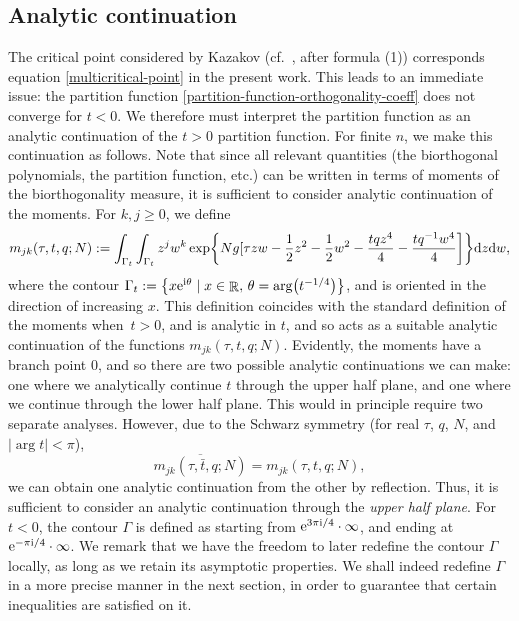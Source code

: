 \documentclass[pdftex]{sigma}
\DeclareMathOperator{\RR}{\mathbb{R}}
\numberwithin{equation}{section}
\begin{document}
\subsection{Analytic continuation}
The critical point considered by Kazakov (cf.~\cite{Kazakov3}, after formula (1)) corresponds equation \eqref{multicritical-point} in the present work.
This leads to an immediate issue: the partition function \eqref{partition-function-orthogonality-coeff} does not converge for $t<0$. We therefore must interpret the partition function as an analytic continuation of the $t>0$ partition function. For finite $n$, we make this continuation as follows. Note that since all relevant quantities (the biorthogonal polynomials, the partition function, etc.) can be written in terms of moments of the biorthogonality measure, it is sufficient to consider
analytic continuation of the moments. For $k,j\geq 0$, we define
 \begin{gather*}
 m_{jk}(\tau,t,q;N) := \int_{\Gamma_{t}}\int_{\Gamma_{t}} z^{j}w^{k}\exp\biggl\{Ng[\tau zw - \frac{1}{2}z^2 - \frac{1}{2}w^2 - \frac{tqz^4}{4} - \frac{tq^{-1}w^4}{4}\biggr]\biggr\}{\rm d}z{\rm d}w,
 \end{gather*}
where the contour $\Gamma_t := \bigl\{x {\rm e}^{{\rm i}\theta}\mid x\in \RR,\, \theta = \arg \bigl(t^{-1/4}\bigr)\bigr\}$, and is oriented in the direction of increasing $x$. This definition coincides with the standard definition of the moments when~${t>0}$, and is analytic in $t$, and so acts as
a suitable analytic continuation of the functions $m_{jk}(\tau,t,q;N)$. Evidently, the moments have a branch point $0$, and so there are
two possible analytic continuations we can make: one where we analytically continue $t$ through the upper half plane, and one where we
continue through the lower half plane. This would in principle require two separate analyses. However, due to the Schwarz symmetry (for real $\tau$, $q$, $N$,
and $|{\arg t}| < \pi$),
 \begin{equation*}%
 \overline{m_{jk}(\tau,\bar{t},q;N)} = m_{jk}(\tau,t,q;N),
 \end{equation*}
we can obtain one analytic continuation from the other by reflection. Thus, it is sufficient to consider an analytic continuation through
the \textit{upper half plane}. For $t<0$, the contour $\Gamma$ is defined as starting from ${\rm e}^{3\pi {\rm i}/4}\cdot \infty$, and ending at
${\rm e}^{-\pi {\rm i}/4}\cdot\infty$. We remark that we have the freedom to later redefine the contour $\Gamma$ locally, as long as we retain its
asymptotic properties. We shall indeed redefine $\Gamma$ in a more precise manner in the next section, in order to guarantee that certain inequalities are satisfied on it.
\end{document}
